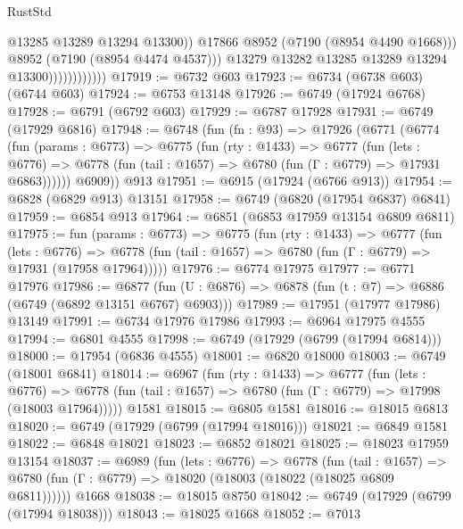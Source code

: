 \begin{lexlean}{RustStd}
\begin{coremodule}
                                    @13285
                                    @13289
                                    @13294
                                    @13300))
                                @17866
                                @8952
                                (@7190 (@8954 @4490 @1668)))
                              @8952
                              (@7190 (@8954 @4474 @4537)))
                            @13279
                            @13282
                            @13285
                            @13289
                            @13294
                            @13300))))))))))))
@17919 := @6732 @603
@17923 := @6734 (@6738 @603) (@6744 @603)
@17924 := @6753 @13148
@17926 := @6749 (@17924 @6768)
@17928 := @6791 (@6792 @603)
@17929 := @6787 @17928
@17931 := @6749 (@17929 @6816)
@17948 := @6748
    (fun (fn : @93) =>
    @17926
      (@6771
        (@6774
          (fun (params : @6773) =>
          @6775
            (fun (rty : @1433) =>
            @6777
              (fun (lets : @6776) =>
              @6778 (fun (tail : @1657) => @6780 (fun (Γ : @6779) => @17931 @6863))))))
        @6909))
    @913
@17951 := @6915 (@17924 (@6766 @913))
@17954 := @6828 (@6829 @913) @13151
@17958 := @6749 (@6820 (@17954 @6837) @6841)
@17959 := @6854 @913
@17964 := @6851 (@6853 @17959 @13154 @6809 @6811)
@17975 := fun (params : @6773) =>
  @6775
    (fun (rty : @1433) =>
    @6777
      (fun (lets : @6776) =>
      @6778 (fun (tail : @1657) => @6780 (fun (Γ : @6779) => @17931 (@17958 @17964)))))
@17976 := @6774 @17975
@17977 := @6771 @17976
@17986 := @6877
    (fun (U : @6876) => @6878 (fun (t : @7) => @6886 (@6749 (@6892 @13151 @6767) @6903)))
@17989 := @17951 (@17977 @17986) @13149
@17991 := @6734 @17976 @17986
@17993 := @6964 @17975 @4555
@17994 := @6801 @4555
@17998 := @6749 (@17929 (@6799 (@17994 @6814)))
@18000 := @17954 (@6836 @4555)
@18001 := @6820 @18000
@18003 := @6749 (@18001 @6841)
@18014 := @6967
    (fun (rty : @1433) =>
    @6777
      (fun (lets : @6776) =>
      @6778 (fun (tail : @1657) => @6780 (fun (Γ : @6779) => @17998 (@18003 @17964)))))
    @1581
@18015 := @6805 @1581
@18016 := @18015 @6813
@18020 := @6749 (@17929 (@6799 (@17994 @18016)))
@18021 := @6849 @1581
@18022 := @6848 @18021
@18023 := @6852 @18021
@18025 := @18023 @17959 @13154
@18037 := @6989
    (fun (lets : @6776) =>
    @6778
      (fun (tail : @1657) =>
      @6780 (fun (Γ : @6779) => @18020 (@18003 (@18022 (@18025 @6809 @6811))))))
    @1668
@18038 := @18015 @8750
@18042 := @6749 (@17929 (@6799 (@17994 @18038)))
@18043 := @18025 @1668
@18052 := @7013

\end{coremodule}
\end{lexlean}
